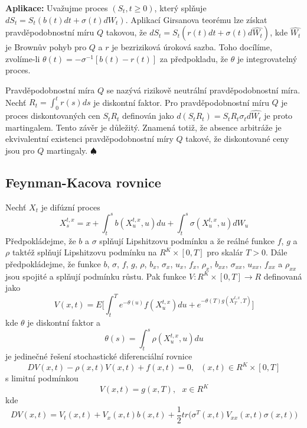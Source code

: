 \documentclass[a4paper]{book}
\begin{document}
\noindent \textbf{Aplikace:} Uvažujme proces $(S_t, t \ge 0)$, který splňuje $d S_t = S_t(b(t)dt + \sigma(t)dW_t)$. Aplikací Girsanova teorému lze získat pravděpodobnostní míru $Q$ takovou, že $dS_t = S_t(r(t) dt + \sigma(t)d \hat{W_t})$, kde $\hat{W_t}$ je Brownův pohyb pro $Q$ a $r$ je bezriziková úroková sazba. Toho docílíme, zvolíme-li $\theta(t) = - \sigma^{-1}[b(t) - r(t)]$ za předpokladu, že $\theta$ je integrovatelný proces.

Pravděpodobnostní míra $Q$ se nazývá rizikově neutrální pravděpodobnostní míra. Nechť $R_t = \int_0^t r(s)ds$ je diskontní faktor. Pro pravděpodobnostní míru $Q$ je proces diskontovaných cen $S_t R_t$ definován jako $d(S_tR_t) = S_t R_t \sigma_t d \hat{W_t}$ je proto martingalem. Tento závěr je důležitý. Znamená totiž, že absence arbitráže je ekvivalentní existenci pravděpodobnostní míry $Q$ takové, že diskontované ceny jsou pro $Q$ martingaly. $\spadesuit$

\subsection{Feynman-Kacova rovnice}

Nechť $X_t$ je difúzní proces
\begin{equation*}
X_s^{t,x} = x + \int_t^s b(X_u^{t,x},u)du + \int_t^s \sigma(X_u^{t,x}, u)dW_u
\end{equation*}
Předpokládejme, že $b$ a $\sigma$ splňují Lipshitzovu podmínku a že reálné funkce $f$, $g$ a $\rho$ taktéž splňují Lipshitzovu podmínku na $R^K \times [0,T]$ pro skalár $T > 0$. Dále předpokládejme, že funkce $b$, $\sigma$, $f$, $g$, $\rho$, $b_x$, $\sigma_x$, $u_x$, $f_x$, $\rho_x$, $b_{xx}$, $\sigma_{xx}$, $u_{xx}$, $f_{xx}$ a $\rho_{xx}$ jsou spojité a splňují podmínku růstu. Pak funkce $V: R^K \times [0,T] \rightarrow R$ definovaná jako
\begin{equation*}
V(x,t) = E \Big[ \int_t^T e^{- \theta(u)} f(X_u^{t,x})du + e^{-\theta(T)g(X_T^{t,x},T)} \Big]
\end{equation*}
kde $\theta$ je diskontní faktor a
\begin{equation*}
\theta(s) = \int_t^s \rho(X_u^{t,x}, u)du
\end{equation*}
je jedinečné řešení stochastické diferenciální rovnice
\begin{equation*}
DV(x,t) - \rho(x,t)V(x,t)+ f(x,t) = 0, ~~~ (x,t) \in R^K \times [0,T]
\end{equation*}
s limitní podmínkou
\begin{equation*}
V(x,t) = g(x,T), ~~~ x \in R^K
\end{equation*}
kde
\begin{equation*}
DV(x,t) = V_t(x,t) + V_x(x,t)b(x,t) + \frac{1}{2}t r \big( \sigma^T(x,t)V_{xx}(x,t)\sigma(x,t) \Big)
\end{equation*}
\end{document}
